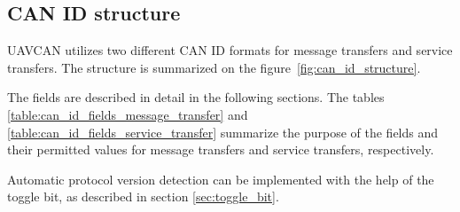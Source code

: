 \subsection{CAN ID structure}

UAVCAN utilizes two different CAN ID formats for message transfers and service transfers.
The structure is summarized on the figure~\ref{fig:can_id_structure}.

The fields are described in detail in the following sections.
The tables \ref{table:can_id_fields_message_transfer} and \ref{table:can_id_fields_service_transfer}
summarize the purpose of the fields and their permitted values
for message transfers and service transfers, respectively.

Automatic protocol version detection can be implemented with the help of the toggle bit,
as described in section \ref{sec:toggle_bit}.

